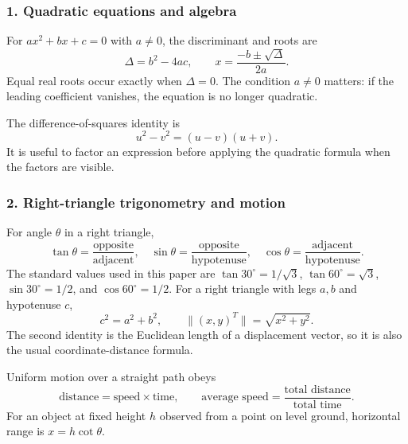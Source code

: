 \renewcommand{\theequation}{F\arabic{equation}}
\setcounter{equation}{0}

\subsubsection*{1. Quadratic equations and algebra}
For $ax^2+bx+c=0$ with $a\ne0$, the discriminant and roots are
\begin{equation}
\Delta=b^2-4ac,\qquad x=\frac{-b\pm\sqrt{\Delta}}{2a}.
\label{eq:quad-general}
\end{equation}
Equal real roots occur exactly when $\Delta=0$. The condition $a\ne0$ matters: if the leading coefficient vanishes, the equation is no longer quadratic.

The difference-of-squares identity is
\begin{equation}
 u^2-v^2=(u-v)(u+v).
\label{eq:difference-squares}
\end{equation}
It is useful to factor an expression before applying the quadratic formula when the factors are visible.

\subsubsection*{2. Right-triangle trigonometry and motion}
For angle $\theta$ in a right triangle,
\begin{equation}
\tan\theta=\frac{\text{opposite}}{\text{adjacent}},\quad
\sin\theta=\frac{\text{opposite}}{\text{hypotenuse}},\quad
\cos\theta=\frac{\text{adjacent}}{\text{hypotenuse}}.
\label{eq:trig-ratios}
\end{equation}
The standard values used in this paper are $\tan30^\circ=1/\sqrt3$, $\tan60^\circ=\sqrt3$, $\sin30^\circ=1/2$, and $\cos60^\circ=1/2$. For a right triangle with legs $a,b$ and hypotenuse $c$,
\begin{equation}
c^2=a^2+b^2,\qquad \|(x,y)^T\|=\sqrt{x^2+y^2}.
\label{eq:pythagoras-distance}
\end{equation}
The second identity is the Euclidean length of a displacement vector, so it is also the usual coordinate-distance formula.

Uniform motion over a straight path obeys
\begin{equation}
\text{distance}=\text{speed}\times\text{time},\qquad
\text{average speed}=\frac{\text{total distance}}{\text{total time}}.
\label{eq:speed-time}
\end{equation}
For an object at fixed height $h$ observed from a point on level ground, horizontal range is $x=h\cot\theta$.


